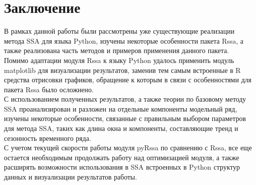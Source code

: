 \documentclass[specialist,
			   substylefile = spbu_report.rtx,
			   subf,href,colorlinks=true, 12pt]{disser}
\begin{document}
\chapter{Заключение}

В рамках данной работы были рассмотрены уже существующие реализации метода SSA для языка Python, изучены некоторые особенности пакета Rssa, а также реализована часть методов и примеров применения данного пакета.\\

Помимо адаптации модуля Rssa к языку Python удалось применить модуль matplotlib для визуализации результатов, заменив тем самым встроенные в R средства отрисовки графиков, обращение к которым в связи с особенностями для пакета Rssa было осложнено.\\

С использованием полученных результатов, а также теории по базовому методу SSA проанализирован и разложен на отдельные компоненты модельный ряд, изучены некоторые особенности, связанные с правильным выбором параметров для метода SSA, таких как длина окна и компоненты, составляющие тренд и сезонность временного ряда.\\

С учетом текущей скорости работы модуля pyRssa по сравнению с Rssa, все еще остается необходимым продолжать работу над оптимизацией модуля, а также расширять возможности использования в SSA встроенных в Python структур данных и визуализации результатов работы.

\printbibliography
{}
\end{document}
